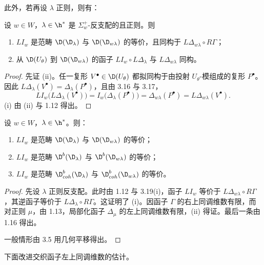 此外，若再设 $\lambda$ 正则，则有：

\begin{theorem}\label{thm:03.3.19}
设 $w\in W$，$\lambda\in\h^*$ 是 $\Sigma^+_w$-反支配的且正则。则
\begin{enumerate}[label=(\roman*),leftmargin=2.2em,itemsep=0pt,topsep=2pt]
\item $LI_w$ 是范畴 $\D(\D_\lambda)$ 与 $\D(\D_{w\lambda})$ 的等价，且同构于 $L\Delta_{w\lambda}\circ R\Gamma$；
\item 从 $\D(U_\theta)$ 到 $\D(\D_{w\lambda})$ 的函子 $LI_w\circ L\Delta_\lambda$ 与 $L\Delta_{w\lambda}$ 同构。
\end{enumerate}
\end{theorem}

\begin{proof}
先证 (ii)。任一复形 $V^\bullet\in\D(U_\theta)$ 都拟同构于由投射 $U_\theta$-模组成的复形 $P^\bullet$。因此 $L\Delta_\lambda(V^\bullet)=\Delta_\lambda(P^\bullet)$，且由 3.16 与 3.17，
$$LI_w\bigl(L\Delta_\lambda(V^\bullet)\bigr)=I_w\bigl(\Delta_\lambda(P^\bullet)\bigr)=\Delta_{w\lambda}(P^\bullet)=L\Delta_{w\lambda}(V^\bullet).$$
(i) 由 (ii) 与 1.12 得出。
\end{proof}

\begin{theorem}\label{thm:03.3.20}
设 $w\in W$，$\lambda\in\h^*$。则：
\begin{enumerate}[label=(\roman*),leftmargin=2.2em,itemsep=0pt,topsep=2pt]
\item $LI_w$ 是范畴 $\D(\D_\lambda)$ 与 $\D(\D_{w\lambda})$ 的等价；
\item $LI_w$ 是范畴 $\D^b(\D_\lambda)$ 与 $\D^b(\D_{w\lambda})$ 的等价；
\item $LI_w$ 是范畴 $\D^b_{coh}(\D_\lambda)$ 与 $\D^b_{coh}(\D_{w\lambda})$ 的等价。
\end{enumerate}
\end{theorem}

\begin{proof}
先设 $\lambda$ 正则反支配。此时由 1.12 与 3.19(i)，函子 $LI_w$ 等价于 $L\Delta_{w\lambda}\circ R\Gamma$，其逆函子等价于 $L\Delta_\lambda\circ R\Gamma$。这证明了 (i)。因函子 $\Gamma$ 的右上同调维数有限，而对正则 $\mu$，由 1.13，局部化函子 $\Delta_\mu$ 的左上同调维数有限，(ii) 得证。最后一条由 1.16 得出。

一般情形由 3.5 用几何平移得出。
\end{proof}

下面改进交织函子左上同调维数的估计。

